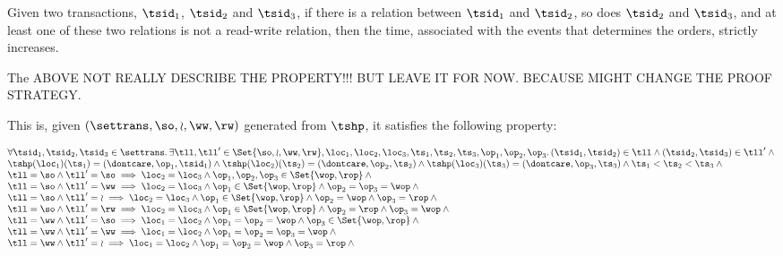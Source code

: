 \begin{lem}
    Given two transactions, \( \tsid_{1} \), \( \tsid_{2} \) and \( \tsid_{3} \), if there is a relation between \( \tsid_{1} \) and \( \tsid_{2} \), so does \( \tsid_{2} \) and \( \tsid_{3} \), and at least one of these two relations is not a read-write relation, then the time, associated with the events that determines the orders, strictly increases.

    The ABOVE NOT REALLY DESCRIBE THE PROPERTY!!! BUT LEAVE IT FOR NOW. BECAUSE MIGHT CHANGE THE PROOF STRATEGY.

    This is, given \( (\settrans, \so, \wr, \ww, \rw) \) generated from \( \tshp \), it satisfies the following property:
     
    \[
        \begin{array}{@{}l@{}}
            \forall \tsid_{1}, \tsid_{2},\tsid_{3} \in \settrans \ldotp \exists \tll, \tll' \in \Set{\so, \wr, \ww, \rw}, \loc_{1}, \loc_{2}, \loc_{3}, \ts_{1}, \ts_{2}, \ts_{3}, \op_{1}, \op_{2}, \op_{3} \ldotp  (\tsid_{1}, \tsid_{2}) \in \tll \land (\tsid_{2}, \tsid_{3}) \in \tll' \land {} \\
            \tshp(\loc_{1})(\ts_{1}) = (\dontcare, \op_{1}, \tsid_{1}) \land \tshp(\loc_{2})(\ts_{2}) = (\dontcare, \op_{2}, \ts_{2}) \land \tshp(\loc_{3})(\ts_{3}) = (\dontcare, \op_{3}, \ts_{3}) \land \ts_{1} < \ts_{2} < \ts_{3} \land {} \\
            \tll = \so \land \tll' = \so \implies \loc_{2} = \loc_{3} \land \op_{1}, \op_{2}, \op_{3} \in \Set{\wop, \rop} \land {} \\
            \tll = \so \land \tll' = \ww \implies \loc_{2} = \loc_{3} \land \op_{1} \in \Set{\wop, \rop} \land \op_{2} = \op_{3} = \wop \land {} \\
            \tll = \so \land \tll' = \wr \implies \loc_{2} = \loc_{3} \land \op_{1} \in \Set{\wop, \rop} \land \op_{2} = \wop \land \op_{3} = \rop \land {} \\
            \tll = \so \land \tll' = \rw \implies \loc_{2} = \loc_{3} \land \op_{1} \in \Set{\wop, \rop} \land \op_{2} = \rop \land \op_{3} = \wop \land {} \\
            \tll = \ww \land \tll' = \so \implies \loc_{1} = \loc_{2} \land \op_{1} = \op_{2} = \wop \land \op_{3} \in \Set{\wop, \rop} \land {} \\
            \tll = \ww \land \tll' = \ww \implies \loc_{1} = \loc_{2} \land \op_{1} = \op_{2} = \op_{3} = \wop \land {} \\
            \tll = \ww \land \tll' = \wr \implies \loc_{1} = \loc_{2} \land \op_{1} = \op_{2} = \wop \land \op_{3} = \rop \land {} \\

\end{array}\]
\end{lem}
